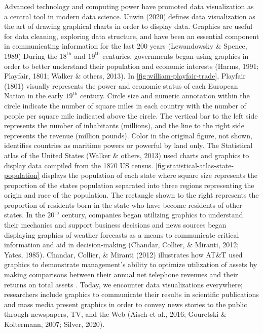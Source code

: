 \documentclass[print]{nuthesis}
\begin{document}
Advanced technology and computing power have promoted data visualization as a central tool in modern data science. Unwin (2020) defines data visualization as the art of drawing graphical charts in order to display data.
Graphics are useful for data cleaning, exploring data structure, and have been an essential component in communicating information for the last 200 years (Lewandowsky \& Spence, 1989)
During the \(\text{18}^{\text{th}}\) and \(\text{19}^{\text{th}}\) centuries, governments began using graphics in order to better understand their population and economic interests (Harms, 1991; Playfair, 1801; Walker \& others, 2013).
In \cref{fig:william-playfair-trade}, Playfair (1801) visually represents the power and economic status of each European Nation in the early \(\text{19}^{\text{th}}\) century.
Circle size and numeric annotation within the circle indicate the number of square miles in each country with the number of people per square mile indicated above the circle.
The vertical bar to the left side represents the number of inhabitants (millions), and the line to the right side represents the revenue (million pounds).
Color in the original figure, not shown, identifies countries as maritime powers or powerful by land only.
The Statistical atlas of the United States (Walker \& others, 2013) used charts and graphics to display data compiled from the 1870 US census.
\cref{fig:statistical-atlas-state-population} displays the population of each state where square size represents the proportion of the states population separated into three regions representing the origin and race of the population.
The rectangle shown to the right represents the proportion of residents born in the state who have become residents of other states.
In the \(\text{20}^{\text{th}}\) century, companies began utilizing graphics to understand their mechanics and support business decisions and news sources began displaying graphics of weather forecasts as a means to communicate critical information and aid in decision-making (Chandar, Collier, \& Miranti, 2012; Yates, 1985).
Chandar, Collier, \& Miranti (2012) illustrates how AT\&T used graphics to demonstrate management's ability to optimize utilization of assets by making comparisons between their annual net telephone revenues and their returns on total assets .
Today, we encounter data visualizations everywhere; researchers include graphics to communicate their results in scientific publications and mass media present graphics in order to convey news stories to the public through newspapers, TV, and the Web (Aisch et al., 2016; Gouretski \& Koltermann, 2007; Silver, 2020).
\end{document}
